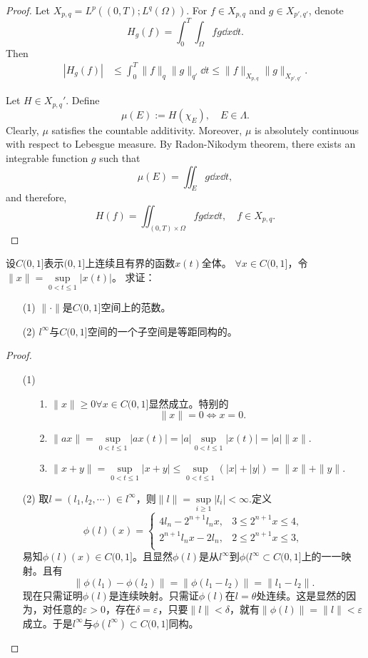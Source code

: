 \begin{proof}
  Let $X_{p,q} = L^p((0,T); L^q(\Omega))$. 
  For $f\in X_{p,q}$ and $g\in X_{p',q'}$, denote 
  \[
  H_g(f) = \int_0^T\int_\Omega fg\dd x\dd t.
  \]
  Then 
  \begin{align*}
    |H_g(f)| &\leq \int_0^T\|f\|_q\|g\|_{q'}\dd t \leq \|f\|_{X_{p,q}}\|g\|_{X_{p',q'}}.
  \end{align*}

  Let $H\in X_{p,q}'$. 
  Define 
  \[
    \mu(E) := H(\chi_E),\quad E\in\Lambda.
  \]  
  Clearly, $\mu$ satisfies the countable additivity.
  Moreover, $\mu$ is absolutely continuous with respect to Lebesgue measure.
  By Radon-Nikodym theorem, there exists an integrable function $g$ such that 
  \[
    \mu(E) = \iint_E g\dd x\dd t,
  \]
  and therefore,
  \[
    H(f) = \iint_{(0,T)\times\Omega}fg\dd x\dd t,\quad f\in X_{p,q}.
  \]
\end{proof}

\begin{exercise}
设$C(0,1]$表示$(0,1]$上连续且有界的函数$x(t)$全体。
$\forall x\in C(0,1]$，令$\|x\|=\sup\limits_{0<t\leq1}|x(t)|$。
求证：
\begin{enumerate}
\item[(1)] $\|\cdot\|$是$C(0,1]$空间上的范数。
\item[(2)] $l^{\infty}$与$C(0,1]$空间的一个子空间是等距同构的。
\end{enumerate}
\end{exercise}

\begin{proof}
\begin{enumerate}
\item[(1)]
\begin{enumerate}
\item[1.]$\|x\|\geq0\forall x\in C(0,1]$显然成立。特别的
$$\|x\|=0\Leftrightarrow x=0.$$
\item[2.]$\|ax\|=\sup\limits_{0<t\leq1}|ax(t)|=|a|\sup\limits_{0<t\leq1}|x(t)|=|a|\|x\|.$
\item[3.]$\|x+y\|=\sup\limits_{0<t\leq1}|x+y|\leq\sup\limits_{0<t\leq1}(|x|+|y|)=\|x\|+\|y\|.$
\end{enumerate}
\item[(2)] 取$l=(l_1,l_2,\cdots)\in l^{\infty}$，则$\|l\|=\sup\limits_{i\geq1}|l_i|<\infty.$定义$$\phi(l)(x)=\begin{cases}
4l_n-2^{n+1}l_nx,&3\leq2^{n+1}x\leq4,\\
2^{n+1}l_nx-2l_n,&2\leq2^{n+1}x\leq3,\\
\end{cases}$$
易知$\phi(l)(x)\in C(0,1]$。且显然$\phi(l)$是从$l^{\infty}$到$\phi(l^{\infty}\subset C(0,1]$上的一一映射。且有$$\|\phi(l_1)-\phi(l_2)\|=\|\phi(l_1-l_2)\|=\|l_1-l_2\|.$$
现在只需证明$\phi(l)$是连续映射。只需证$\phi(l)$在$l=\theta$处连续。这是显然的因为，对任意的$\varepsilon>0$，存在$\delta=\varepsilon$，只要$\|l\|<\delta$，就有$\|\phi(l)\|=\|l\|<\varepsilon$成立。于是$l^{\infty}$与$\phi(l^{\infty})\subset C(0,1]$同构。
\end{enumerate}
\end{proof}

